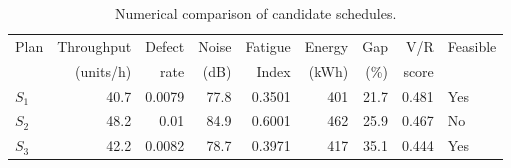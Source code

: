 \begin{table}[htbp]
\centering
\caption{Numerical comparison of candidate schedules.}
\label{tab:numerical-sim}
\small
\begin{tabular}{@{}lrrrrrrrl@{}}
\toprule
Plan & Throughput & Defect & Noise & Fatigue & Energy & Gap & V/R & Feasible \\
     & (units/h)  & rate   & (dB)  & Index   & (kWh)  & (\%) & score &         \\
\midrule
$S_{1}$ & 40.7 & 0.0079 & 77.8 & 0.3501 & 401 & 21.7 & 0.481 & Yes \\
$S_{2}$ & 48.2 & 0.01 & 84.9 & 0.6001 & 462 & 25.9 & 0.467 & No \\
$S_{3}$ & 42.2 & 0.0082 & 78.7 & 0.3971 & 417 & 35.1 & 0.444 & Yes \\
\bottomrule
\end{tabular}
\end{table}
